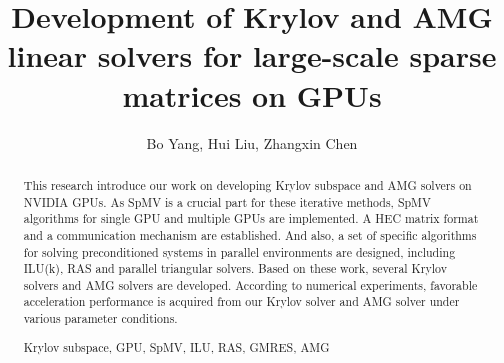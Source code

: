 \documentclass[runningheads,a4paper]{llncs}
\newcommand{\keywords}[1]{\par\addvspace\baselineskip
\noindent\keywordname\enspace\ignorespaces#1}
\begin{document}
\mainmatter  
\title{Development of Krylov and AMG linear solvers for large-scale sparse matrices on GPUs}


\author{Bo Yang, Hui Liu, Zhangxin Chen}


\maketitle

\begin{abstract}
This research introduce our work on developing Krylov subspace and AMG solvers on NVIDIA GPUs.
As SpMV is a crucial part for these iterative methods, SpMV algorithms for single GPU and multiple GPUs are implemented.
A HEC matrix format and a communication mechanism are established. And also, a set of specific algorithms for solving preconditioned
systems in parallel environments are designed, including ILU(k), RAS and parallel triangular solvers.
Based on these work, several Krylov solvers and AMG solvers are developed.
According to numerical experiments, favorable acceleration performance is acquired
from our Krylov solver and AMG solver under various parameter conditions.
\keywords{Krylov subspace, GPU, SpMV, ILU, RAS, GMRES, AMG}
\end{abstract}
\end{document}
